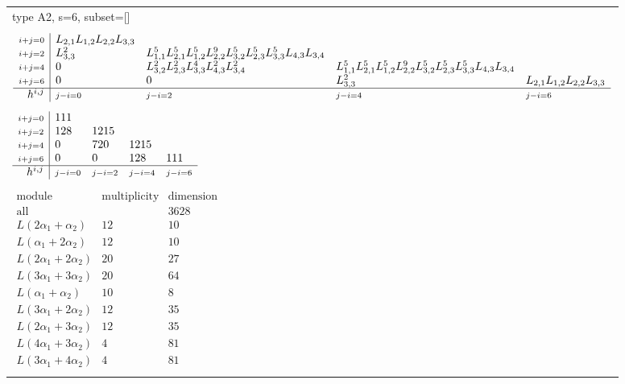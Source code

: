 \documentclass[crop,border=2mm]{standalone}
\begin{document}
\begin{tabular}{l}
{\huge type A2, s=6, subset=[]}\\ \\


$\displaystyle
\begin{array}{r|l l l l}
	{\scriptstyle i+j=0}&L_{2,1}L_{1,2}L_{2,2}L_{3,3}&&&\\
	{\scriptstyle i+j=2}&L_{3,3}^{2}&L_{1,1}^{5}L_{2,1}^{5}L_{1,2}^{5}L_{2,2}^{9}L_{3,2}^{5}L_{2,3}^{5}L_{3,3}^{5}L_{4,3}L_{3,4}&&\\
	{\scriptstyle i+j=4}&0&L_{3,2}^{2}L_{2,3}^{2}L_{3,3}^{4}L_{4,3}^{2}L_{3,4}^{2}&L_{1,1}^{5}L_{2,1}^{5}L_{1,2}^{5}L_{2,2}^{9}L_{3,2}^{5}L_{2,3}^{5}L_{3,3}^{5}L_{4,3}L_{3,4}&\\
	{\scriptstyle i+j=6}&0&0&L_{3,3}^{2}&L_{2,1}L_{1,2}L_{2,2}L_{3,3}\\
	\hline h^{i,j}&{\scriptstyle j-i=0}&{\scriptstyle j-i=2}&{\scriptstyle j-i=4}&{\scriptstyle j-i=6}
\end{array}
$ \\ \\


$\displaystyle
\begin{array}{r|l l l l}
	{\scriptstyle i+j=0}&111&&&\\
	{\scriptstyle i+j=2}&128&1215&&\\
	{\scriptstyle i+j=4}&0&720&1215&\\
	{\scriptstyle i+j=6}&0&0&128&111\\
	\hline h^{i,j}&{\scriptstyle j-i=0}&{\scriptstyle j-i=2}&{\scriptstyle j-i=4}&{\scriptstyle j-i=6}
\end{array}
$ \\ \\


$\displaystyle
\begin{array}{rll}
	\text{module}&\text{multiplicity}&\text{dimension} \\ \hline \text{all}&&3628 \\
	L\left( 2\alpha_{1}+\alpha_{2}\right)&12&10\\
	L\left(\alpha_{1}+ 2\alpha_{2}\right)&12&10\\
	L\left( 2\alpha_{1}+ 2\alpha_{2}\right)&20&27\\
	L\left( 3\alpha_{1}+ 3\alpha_{2}\right)&20&64\\
	L\left(\alpha_{1}+\alpha_{2}\right)&10&8\\
	L\left( 3\alpha_{1}+ 2\alpha_{2}\right)&12&35\\
	L\left( 2\alpha_{1}+ 3\alpha_{2}\right)&12&35\\
	L\left( 4\alpha_{1}+ 3\alpha_{2}\right)&4&81\\
	L\left( 3\alpha_{1}+ 4\alpha_{2}\right)&4&81
\end{array}
$ \\ \\

\end{tabular}
\end{document}
